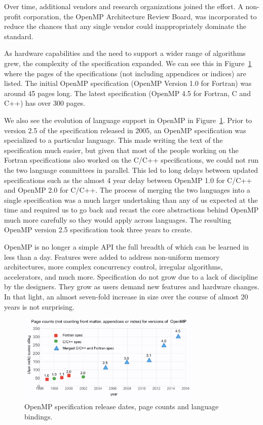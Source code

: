 Over time, additional vendors and research organizations joined the effort.  A
non-profit corporation, the OpenMP Architecture Review Board, was incorporated
to reduce the chances that any single vendor could inappropriately dominate the
standard.

As hardware capabilities and the need to support a wider range of algorithms
grew, the complexity of the specification expanded.  We can see this in
Figure~\ref{omppcount} where the pages of the specifications (not including
appendices or indices) are listed.   The initial OpenMP specification (OpenMP
Version 1.0 for Fortran) was around 45 pages long.  The  latest specification
(OpenMP 4.5 for Fortran, C and C++)  has over 300 pages.

We also see the evolution of language support in OpenMP in
Figure~\ref{omppcount}.  Prior to version 2.5 of the specification released in
2005, an OpenMP specification was specialized to a particular language.   This
made writing the text of the specification much easier, but given that most of
the people working on the Fortran specifications also worked on the C/C++
specifications, we could not run the two language committees in parallel.  This
led to long delays between updated specifications such as the almost 4 year
delay between OpenMP 1.0 for C/C++ and OpenMP 2.0 for C/C++.  The process of
merging the two languages into a single specification was a much larger
undertaking than any of us expected at the time and required us to go back and
recast the core abstractions behind OpenMP much more carefully so they would
apply across languages.  The resulting OpenMP version 2.5 specification took
three years to create.

OpenMP is no longer a simple API the full breadth of which can be learned in
less than a day.  Features were added to address non-uniform memory
architectures, more complex concurrency control, irregular algorithms,
accelerators, and much more.   Specification do not grow due to a lack of
discipline by the designers.  They grow as users demand new features and
hardware changes.  In that light, an almost seven-fold increase in size over the
course of almost 20 years is not surprising.

\begin{figure}
  \centering
  \includegraphics[width=3.4in]{pics/opcounts.png}
  \caption{OpenMP specification release dates, page counts and language bindings.}
  \label{omppcount}
\end{figure}


